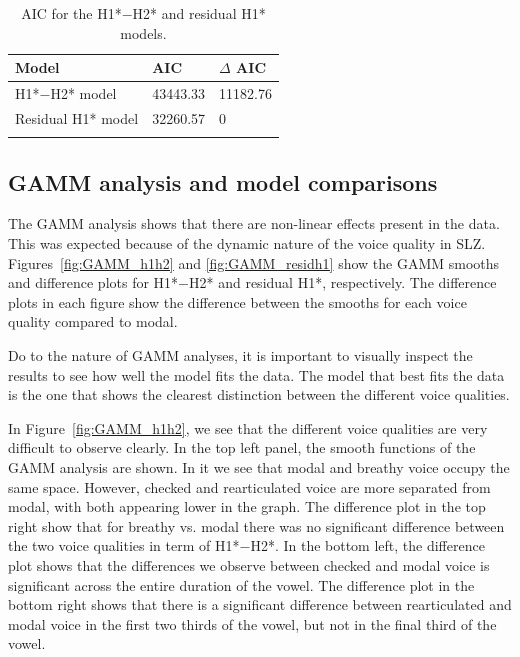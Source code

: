 \begin{table}[!h]
  \centering
  \caption{AIC for the H1*$-$H2* and residual H1* models.}
  \label{tab:Comparison}
  \begin{tabular}{lll}
    \lsptoprule
    Model  & AIC & $\Delta$ AIC\\
    \hline
    H1*$-$H2* model & 43443.33 & 11182.76 \\
    Residual H1* model & 32260.57 & 0 \\
    \lspbottomrule
  \end{tabular}
\end{table}

\subsection{GAMM analysis and model comparisons} \label{sec:GAMM}

The GAMM analysis shows that there are non-linear effects present in the data. This was expected because of the dynamic nature of the voice quality in SLZ. Figures~\ref{fig:GAMM_h1h2} and \ref{fig:GAMM_residh1} show the GAMM smooths and difference plots for H1*$-$H2* and residual H1*, respectively. The difference plots in each figure show the difference between the smooths for each voice quality compared to modal.

Do to the nature of GAMM analyses, it is important to visually inspect the results to see how well the model fits the data. The model that best fits the data is the one that shows the clearest distinction between the different voice qualities.

In Figure~\ref{fig:GAMM_h1h2}, we see that the different voice qualities are very difficult to observe clearly. In the top left panel, the smooth functions of the GAMM analysis are shown. In it we see that modal and breathy voice occupy the same space. However, checked and rearticulated voice are more separated from modal, with both appearing lower in the graph. The difference plot in the top right show that for breathy vs. modal there was no significant difference between the two voice qualities in term of H1*$-$H2*. In the bottom left, the difference plot shows that the differences we observe between checked and modal voice is significant across the entire duration of the vowel. The difference plot in the bottom right shows that there is a significant difference between rearticulated and modal voice in the first two thirds of the vowel, but not in the final third of the vowel.

